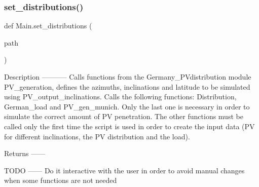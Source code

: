 \subsubsection{\texorpdfstring{set\+\_\+distributions()}{set\_distributions()}}
{\footnotesize\ttfamily def Main.\+set\+\_\+distributions (\begin{DoxyParamCaption}\item[{}]{path }\end{DoxyParamCaption})}

\begin{DoxyVerb}Description
-----------
Calls functions from the Germany_PVdistribution module
PV_generation, defines the azimuths, inclinations and latitude to be simulated using PV_output_inclinations. Calls the following functions: Distribution, German_load and PV_gen_munich. Only the last one is necessary in order to simulate the correct amount of PV penetration. The other functions must be called only the first time the script is used in order to create the input data (PV for different inclinations, the PV distribution and the load).

Returns
------

TODO
------
Do it interactive with the user in order to avoid manual changes when some functions are not needed
\end{DoxyVerb}
 
